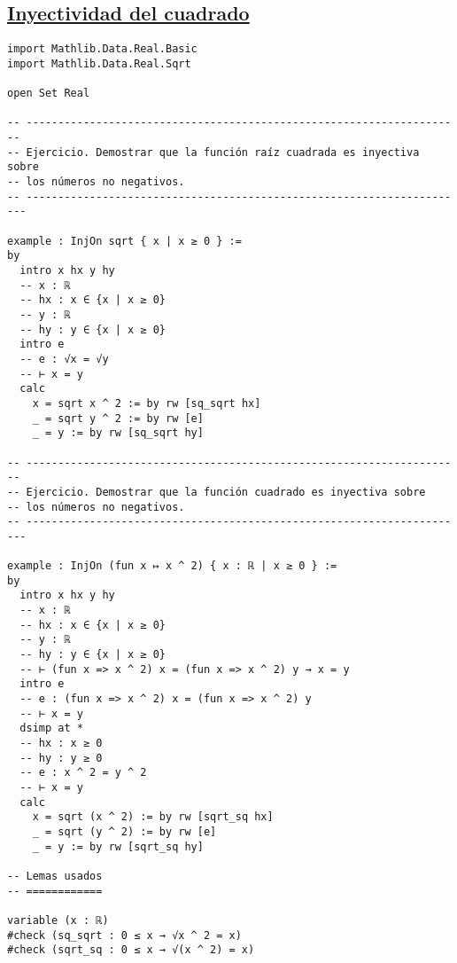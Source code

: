 \subsection{\href{./src/Conjuntos/Inyectividad\_del\_cuadrado.lean}{Inyectividad del cuadrado}}
\label{sec:org4e6cf2a}
\begin{verbatim}
import Mathlib.Data.Real.Basic
import Mathlib.Data.Real.Sqrt

open Set Real

-- ---------------------------------------------------------------------
-- Ejercicio. Demostrar que la función raíz cuadrada es inyectiva sobre
-- los números no negativos.
-- ----------------------------------------------------------------------

example : InjOn sqrt { x | x ≥ 0 } :=
by
  intro x hx y hy
  -- x : ℝ
  -- hx : x ∈ {x | x ≥ 0}
  -- y : ℝ
  -- hy : y ∈ {x | x ≥ 0}
  intro e
  -- e : √x = √y
  -- ⊢ x = y
  calc
    x = sqrt x ^ 2 := by rw [sq_sqrt hx]
    _ = sqrt y ^ 2 := by rw [e]
    _ = y := by rw [sq_sqrt hy]

-- ---------------------------------------------------------------------
-- Ejercicio. Demostrar que la función cuadrado es inyectiva sobre
-- los números no negativos.
-- ----------------------------------------------------------------------

example : InjOn (fun x ↦ x ^ 2) { x : ℝ | x ≥ 0 } :=
by
  intro x hx y hy
  -- x : ℝ
  -- hx : x ∈ {x | x ≥ 0}
  -- y : ℝ
  -- hy : y ∈ {x | x ≥ 0}
  -- ⊢ (fun x => x ^ 2) x = (fun x => x ^ 2) y → x = y
  intro e
  -- e : (fun x => x ^ 2) x = (fun x => x ^ 2) y
  -- ⊢ x = y
  dsimp at *
  -- hx : x ≥ 0
  -- hy : y ≥ 0
  -- e : x ^ 2 = y ^ 2
  -- ⊢ x = y
  calc
    x = sqrt (x ^ 2) := by rw [sqrt_sq hx]
    _ = sqrt (y ^ 2) := by rw [e]
    _ = y := by rw [sqrt_sq hy]

-- Lemas usados
-- ============

variable (x : ℝ)
#check (sq_sqrt : 0 ≤ x → √x ^ 2 = x)
#check (sqrt_sq : 0 ≤ x → √(x ^ 2) = x)
\end{verbatim}

